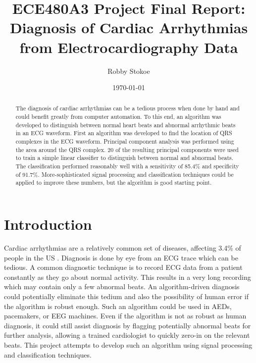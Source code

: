 \documentclass[titlepage,12pt,letter]{article}
\title{ECE480A3 Project Final Report: \\ Diagnosis of Cardiac Arrhythmias from 
Electrocardiography Data}
\author{Robby Stokoe}
\date{\today}
\begin{document}
\maketitle

\begin{abstract}
    The diagnosis of cardiac arrhythmias can be a tedious process when done by
    hand and could benefit greatly from computer automation.  To this end, an
    algorithm was developed to distinguish between normal heart beats and
    abnormal arrhythmic beats in an ECG waveform.  First an algorithm was
    developed to find the location of QRS complexes in the ECG waveform.
    Principal component analysis was performed using the area around the QRS
    complex.  20 of the resulting principal components were used to train a
    simple linear classifier to distinguish between normal and abnormal beats.
    The classification performed reasonably well with a sensitivity of 85.4\%
    and specificity of 91.7\%. More-sophisticated signal processing and
    classification techniques could be applied to improve these numbers, but the
    algorithm is good starting point.  
\end{abstract}

\tableofcontents

\newpage
\section{Introduction} 
Cardiac arrhythmias are a relatively common set of diseases, affecting 3.4\% of
people in the US \cite{cdc95}.  Diagnosis is done by eye from an ECG trace which
can be tedious.  A common diagnostic technique is to record ECG data from a
patient constantly as they go about normal activity.  This results in a very
long recording which may contain only a few abnormal beats.  An algorithm-driven
diagnosis could potentially eliminate this tedium and also the possibility of
human error if the algorithm is robust enough.  Such an algorithm could be used
in AEDs, pacemakers, or EEG machines.  Even if the algorithm is not as robust as
human diagnosis, it could still assist diagnosis by flagging potentially
abnormal beats for further analysis, allowing a trained cardiologist to quickly
zero-in on the relevant beats.  This project attempts to develop such an
algorithm using signal processing and classification techniques.  
\end{document}
